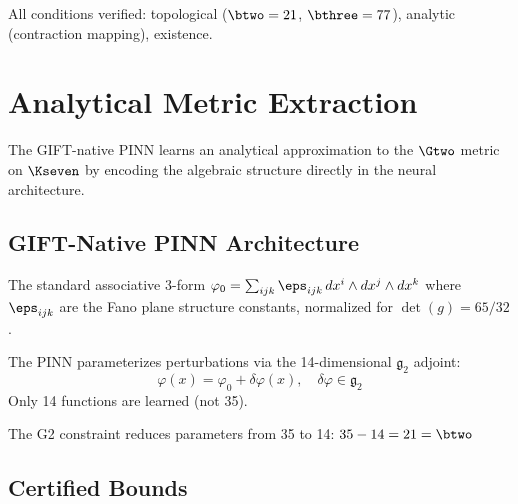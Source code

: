 \begin{theorem}\label{thm:joyce_cert}
    \leanok
    All conditions verified: topological ($\btwo = 21$, $\bthree = 77$),
    analytic (contraction mapping), existence.
\end{theorem}

\chapter{Analytical Metric Extraction}\label{chap:analytical}

The GIFT-native PINN learns an analytical approximation to the $\Gtwo$ metric
on $\Kseven$ by encoding the algebraic structure directly in the neural architecture.

\section{GIFT-Native PINN Architecture}

\begin{definition}\label{def:phi0_standard}
    \leanok
    The standard associative 3-form $\varphi_0 = \sum_{ijk} \eps_{ijk}\, dx^i \wedge dx^j \wedge dx^k$
    where $\eps_{ijk}$ are the Fano plane structure constants, normalized for $\det(g) = 65/32$.
\end{definition}

\begin{definition}\label{def:delta_phi}
    The PINN parameterizes perturbations via the 14-dimensional $\mathfrak{g}_2$ adjoint:
    \[
        \varphi(x) = \varphi_0 + \delta\varphi(x), \quad \delta\varphi \in \mathfrak{g}_2
    \]
    Only 14 functions are learned (not 35).
\end{definition}

\begin{theorem}\label{thm:dim_reduction}
    The G2 constraint reduces parameters from 35 to 14:
    $35 - 14 = 21 = \btwo$
\end{theorem}

\section{Certified Bounds}

